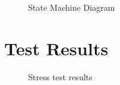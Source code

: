 \begin{figure}
	\caption{State Machine Diagram}
\label{fig:stateMachine}
\end{figure}

\FloatBarrier
\section{Test Results}
\begin{figure}[ht!]
	\caption{Stress test results}
\label{fig:stressTestResults}
\end{figure}

\FloatBarrier
